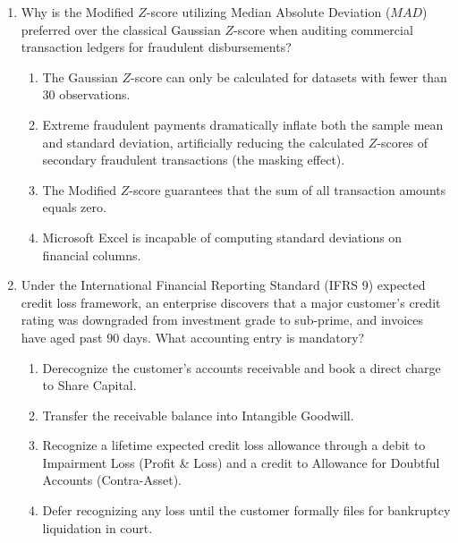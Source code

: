 \begin{enumerate}[label=\textbf{MCQ 6.\arabic*}]
    \item Why is the Modified $Z$-score utilizing Median Absolute Deviation ($MAD$) preferred over the classical Gaussian $Z$-score when auditing commercial transaction ledgers for fraudulent disbursements?
    \begin{enumerate}[label=(\alph*)]
        \item The Gaussian $Z$-score can only be calculated for datasets with fewer than $30$ observations.
        \item Extreme fraudulent payments dramatically inflate both the sample mean and standard deviation, artificially reducing the calculated $Z$-scores of secondary fraudulent transactions (the masking effect).
        \item The Modified $Z$-score guarantees that the sum of all transaction amounts equals zero.
        \item Microsoft Excel is incapable of computing standard deviations on financial columns.
    \end{enumerate}

    \item Under the International Financial Reporting Standard (IFRS 9) expected credit loss framework, an enterprise discovers that a major customer's credit rating was downgraded from investment grade to sub-prime, and invoices have aged past $90$ days. What accounting entry is mandatory?
    \begin{enumerate}[label=(\alph*)]
        \item Derecognize the customer's accounts receivable and book a direct charge to Share Capital.
        \item Transfer the receivable balance into Intangible Goodwill.
        \item Recognize a lifetime expected credit loss allowance through a debit to Impairment Loss (Profit \& Loss) and a credit to Allowance for Doubtful Accounts (Contra-Asset).
        \item Defer recognizing any loss until the customer formally files for bankruptcy liquidation in court.
    \end{enumerate}
\end{enumerate}

